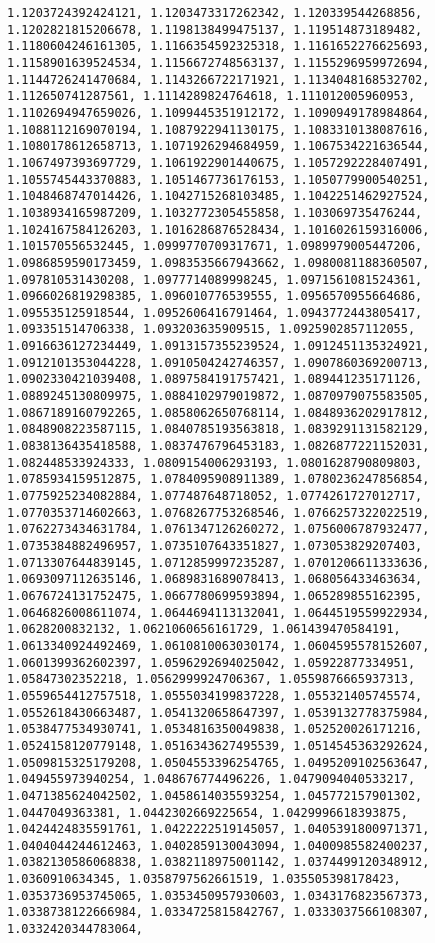 \documentclass[11pt]{article}
\begin{document}
\begin{Verbatim}[commandchars=\\\{\}]
1.1203724392424121, 1.1203473317262342, 1.120339544268856, 1.1202821815206678, 1.1198138499475137, 1.119514873189482, 1.1180604246161305, 1.1166354592325318, 1.1161652276625693, 1.1158901639524534, 1.1156672748563137, 1.1155296959972694, 1.1144726241470684, 1.1143266722171921, 1.1134048168532702, 1.112650741287561, 1.1114289824764618, 1.111012005960953, 1.1102694947659026, 1.1099445351912172, 1.1090949178984864, 1.1088112169070194, 1.1087922941130175, 1.1083310138087616, 1.1080178612658713, 1.1071926294684959, 1.1067534221636544, 1.1067497393697729, 1.1061922901440675, 1.1057292228407491, 1.1055745443370883, 1.1051467736176153, 1.1050779900540251, 1.1048468747014426, 1.1042715268103485, 1.1042251462927524, 1.1038934165987209, 1.1032772305455858, 1.103069735476244, 1.1024167584126203, 1.1016286876528434, 1.1016026159316006, 1.101570556532445, 1.0999770709317671, 1.0989979005447206, 1.0986859590173459, 1.0983535667943662, 1.0980081188360507, 1.097810531430208, 1.0977714089998245, 1.0971561081524361, 1.0966026819298385, 1.096010776539555, 1.0956570955664686, 1.095535125918544, 1.0952606416791464, 1.0943772443805417, 1.093351514706338, 1.093203635909515, 1.0925902857112055, 1.0916636127234449, 1.0913157355239524, 1.0912451135324921, 1.0912101353044228, 1.0910504242746357, 1.0907860369200713, 1.0902330421039408, 1.0897584191757421, 1.089441235171126, 1.0889245130809975, 1.0884102979019872, 1.0870979075583505, 1.0867189160792265, 1.0858062650768114, 1.0848936202917812, 1.0848908223587115, 1.0840785193563818, 1.0839291131582129, 1.0838136435418588, 1.0837476796453183, 1.0826877221152031, 1.082448533924333, 1.0809154006293193, 1.0801628790809803, 1.0785934159512875, 1.0784095908911389, 1.0780236247856854, 1.0775925234082884, 1.077487648718052, 1.0774261727012717, 1.0770353714602663, 1.0768267753268546, 1.0766257322022519, 1.0762273434631784, 1.0761347126260272, 1.0756006787932477, 1.0735384882496957, 1.0735107643351827, 1.073053829207403, 1.0713307644839145, 1.0712859997235287, 1.0701206611333636, 1.0693097112635146, 1.0689831689078413, 1.068056433463634, 1.0676724131752475, 1.0667780699593894, 1.065289855162395, 1.0646826008611074, 1.0644694113132041, 1.0644519559922934, 1.0628200832132, 1.0621060656161729, 1.061439470584191, 1.0613340924492469, 1.0610810063030174, 1.0604595578152607, 1.0601399362602397, 1.0596292694025042, 1.05922877334951, 1.05847302352218, 1.0562999924706367, 1.0559876665937313, 1.0559654412757518, 1.0555034199837228, 1.055321405745574, 1.0552618430663487, 1.0541320658647397, 1.0539132778375984, 1.0538477534930741, 1.0534816350049838, 1.052520026171216, 1.0524158120779148, 1.0516343627495539, 1.0514545363292624, 1.0509815325179208, 1.0504553396254765, 1.0495209102563647, 1.049455973940254, 1.048676774496226, 1.0479094040533217, 1.0471385624042502, 1.0458614035593254, 1.045772157901302, 1.0447049363381, 1.0442302669225654, 1.0429996618393875, 1.0424424835591761, 1.0422222519145057, 1.0405391800971371, 1.0404044244612463, 1.0402859130043094, 1.0400985582400237, 1.0382130586068838, 1.0382118975001142, 1.0374499120348912, 1.0360910634345, 1.0358797562661519, 1.035505398178423, 1.0353736953745065, 1.0353450957930603, 1.0343176823567373, 1.0338738122666984, 1.0334725815842767, 1.0333037566108307, 1.0332420344783064, 
\end{Verbatim}
\end{document}
